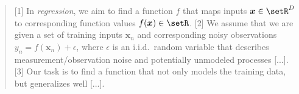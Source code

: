 \documentclass[11pt, a4paper]{article}
\begin{document}
\begin{quote}
 [1] In \emph{regression}, we aim to find a function $f$ that maps
 inputs $\bm{x} \in \setR^D$ to corresponding function values $f(\bm{x})
 \in\setR$. [2] We assume that we are given a set of training inputs
 $\bm{x}_n$ and corresponding noisy observations $y_n = f(\bm{x}_n) +
 \epsilon$, where $\epsilon$ is an i.i.d.\ random variable that describes
 measurement/observation noise and potentially unmodeled processes
 [...]. [3] Our task is to find a function that not only models the
 training data, but generalizes well [...].
\end{quote}
\end{document}
